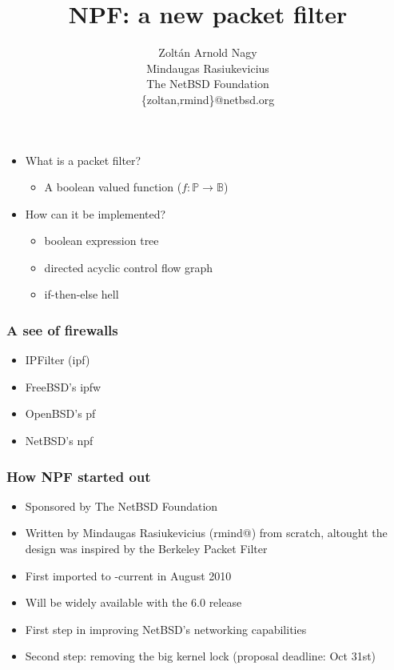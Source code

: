 \documentclass[magyar]{beamer}
\date{}
\begin{document}
\title{NPF: a new packet filter}
\author{Zoltán Arnold Nagy\\ Mindaugas Rasiukevicius \\ The NetBSD Foundation \\ \{zoltan,rmind\}@netbsd.org}
\maketitle

\begin{frame}
\begin{itemize}
	\item What is a packet filter?
\pause
	\begin{itemize}
		\item A boolean valued function ($f:\mathbb{P} \rightarrow \mathbb{B}$)
	\end{itemize}
\pause
	\item How can it be implemented?
\pause
	\begin{itemize}
		\item boolean expression tree
		\item directed acyclic control flow graph
		\item if-then-else hell
	\end{itemize}
\end{itemize}
\end{frame}

\begin{frame}
\frametitle{A see of firewalls}
\begin{itemize}
	\item IPFilter (ipf)
	\item FreeBSD's ipfw
	\item OpenBSD's pf
	\item NetBSD's npf
\end{itemize}
\end{frame}

\begin{frame}
\frametitle{How NPF started out}
\begin{itemize}
	\item Sponsored by The NetBSD Foundation
	\item Written by Mindaugas Rasiukevicius (rmind@) from scratch, altought the design was inspired by the Berkeley Packet Filter
	\item First imported to -current in August 2010
	\item Will be widely available with the 6.0 release
	\item First step in improving NetBSD's networking capabilities
	\item Second step: removing the big kernel lock (proposal deadline: Oct 31st)
\end{itemize}
\end{frame}
\end{document}
